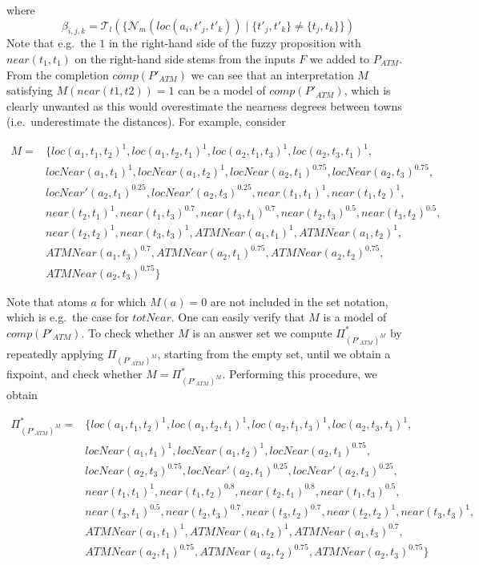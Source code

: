 \documentclass{tlp}
\newcommand{\comp}[1]{\ensuremath{comp(#1)}}
\newcommand{\fneg}[2]{\ensuremath{\mathcal{N}_{#1}(#2)}}
\newcommand{\mneg}[1]{\fneg{m}{#1}}
\newcommand{\pretnorm}{\mathcal{T}}
\newcommand{\nfimcons}[1]{\Pi_{#1}}
\newcommand{\lfpnfimcons}[1]{\nfimcons{#1}^{*}}
\begin{document}
where 
$$\beta_{i,j,k} = \pretnorm_l(\{\mneg{loc(a_i,t'_j,t'_k)} \mid \{t'_j,t'_k \} \neq \{ t_j,t_k \} \} )$$
Note that e.g.~the $1$ in the right-hand side of the fuzzy proposition with $near(t_1,t_1)$ on the right-hand side stems from the inputs $F$ we added to $P_{\mathit{ATM}}$.
From the completion $\comp{P'_{\mathit{ATM}}}$ we can see that an interpretation $M$ satisfying $M(near(t1,t2)) = 1$ can be a model of $\comp{P'_{\mathit{ATM}}}$, which is clearly unwanted as this would overestimate the nearness degrees between towns (i.e.~underestimate the distances). For example, consider 



\begin{align*}
M = & \{loc(a_1,t_1,t_2)^{1},loc(a_1,t_2,t_1)^1,loc(a_2,t_1,t_3)^{1}, loc(a_2,t_3,t_1)^1,\\
& locNear(a_1,t_1)^{1}, locNear(a_1,t_2)^{1}, locNear(a_2,t_1)^{0.75},locNear(a_2,t_3)^{0.75},\\
& locNear'(a_2,t_1)^{0.25},locNear'(a_2,t_3)^{0.25},near(t_1,t_1)^{1},near(t_1,t_2)^{1},\\
& near(t_2,t_1)^{1}, near(t_1,t_3)^{0.7}, near(t_3,t_1)^{0.7}, near(t_2,t_3)^{0.5}, near(t_3,t_2)^{0.5},\\
& near(t_2,t_2)^{1},near(t_3,t_3)^{1},\mathit{ATMNear(a_1,t_1)}^{1}, \mathit{ATMNear(a_1,t_2)}^{1},\\
& \mathit{ATMNear}(a_1,t_3)^{0.7},\mathit{ATMNear}(a_2,t_1)^{0.75}, \mathit{ATMNear}(a_2,t_2)^{0.75},\\
& \mathit{ATMNear}(a_2,t_3)^{0.75} \}
\end{align*}

Note that atoms $a$ for which $M(a) = 0$ are not included in the set notation, which is e.g.~the case for $totNear$. One can easily verify that $M$ is a model of $\comp{P'_{\mathit{ATM}}}$.
To check whether $M$ is an answer set we compute $\lfpnfimcons{(P'_{\mathit{ATM}})^M}$ by repeatedly applying $\nfimcons{(P'_{\mathit{ATM}})^M}$, starting from the empty set, until we obtain a fixpoint, and check whether $M = \lfpnfimcons{(P'_{\mathit{ATM}})^M}$. Performing this procedure, we obtain

\begin{align*}
\lfpnfimcons{(P'_{\mathit{ATM}})^M} = & \{loc(a_1,t_1,t_2)^{1},loc(a_1,t_2,t_1)^1,loc(a_2,t_1,t_3)^{1}, loc(a_2,t_3,t_1)^1,\\
& locNear(a_1,t_1)^{1}, locNear(a_1,t_2)^{1}, locNear(a_2,t_1)^{0.75},\\
& locNear(a_2,t_3)^{0.75},locNear'(a_2,t_1)^{0.25},locNear'(a_2,t_3)^{0.25},\\
& near(t_1,t_1)^{1},near(t_1,t_2)^{0.8},near(t_2,t_1)^{0.8}, near(t_1,t_3)^{0.5},\\
& near(t_3,t_1)^{0.5},near(t_2,t_3)^{0.7}, near(t_3,t_2)^{0.7},near(t_2,t_2)^{1},near(t_3,t_3)^{1},\\
& \mathit{ATMNear(a_1,t_1)}^{1},\mathit{ATMNear(a_1,t_2)}^{1},\mathit{ATMNear}(a_1,t_3)^{0.7},\\
& \mathit{ATMNear}(a_2,t_1)^{0.75},\mathit{ATMNear}(a_2,t_2)^{0.75},\mathit{ATMNear}(a_2,t_3)^{0.75} \}
\end{align*}
\end{document}
